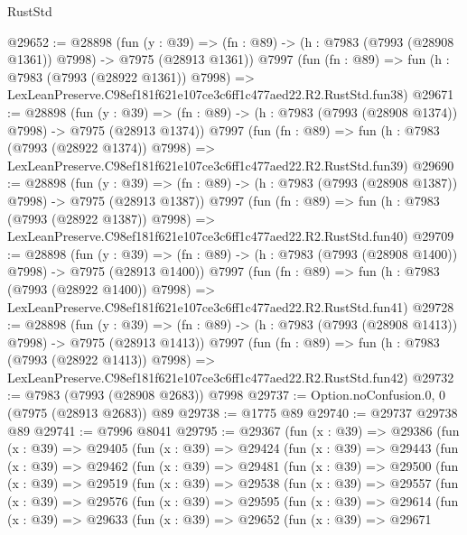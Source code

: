 \begin{lexlean}{RustStd}
\begin{coremodule}
@29652 := @28898
    (fun (y : @39) =>
    (fn : @89) -> (h : @7983 (@7993 (@28908 @1361)) @7998) -> @7975 (@28913 @1361))
    @7997
    (fun (fn : @89) =>
    fun (h : @7983 (@7993 (@28922 @1361)) @7998) =>
    LexLeanPreserve.C98ef181f621e107ce3c6ff1c477aed22.R2.RustStd.fun38)
@29671 := @28898
    (fun (y : @39) =>
    (fn : @89) -> (h : @7983 (@7993 (@28908 @1374)) @7998) -> @7975 (@28913 @1374))
    @7997
    (fun (fn : @89) =>
    fun (h : @7983 (@7993 (@28922 @1374)) @7998) =>
    LexLeanPreserve.C98ef181f621e107ce3c6ff1c477aed22.R2.RustStd.fun39)
@29690 := @28898
    (fun (y : @39) =>
    (fn : @89) -> (h : @7983 (@7993 (@28908 @1387)) @7998) -> @7975 (@28913 @1387))
    @7997
    (fun (fn : @89) =>
    fun (h : @7983 (@7993 (@28922 @1387)) @7998) =>
    LexLeanPreserve.C98ef181f621e107ce3c6ff1c477aed22.R2.RustStd.fun40)
@29709 := @28898
    (fun (y : @39) =>
    (fn : @89) -> (h : @7983 (@7993 (@28908 @1400)) @7998) -> @7975 (@28913 @1400))
    @7997
    (fun (fn : @89) =>
    fun (h : @7983 (@7993 (@28922 @1400)) @7998) =>
    LexLeanPreserve.C98ef181f621e107ce3c6ff1c477aed22.R2.RustStd.fun41)
@29728 := @28898
    (fun (y : @39) =>
    (fn : @89) -> (h : @7983 (@7993 (@28908 @1413)) @7998) -> @7975 (@28913 @1413))
    @7997
    (fun (fn : @89) =>
    fun (h : @7983 (@7993 (@28922 @1413)) @7998) =>
    LexLeanPreserve.C98ef181f621e107ce3c6ff1c477aed22.R2.RustStd.fun42)
@29732 := @7983 (@7993 (@28908 @2683)) @7998
@29737 := Option.noConfusion.{0, 0} (@7975 (@28913 @2683)) @89
@29738 := @1775 @89
@29740 := @29737 @29738 @89
@29741 := @7996 @8041
@29795 := @29367
    (fun (x : @39) =>
    @29386
      (fun (x : @39) =>
      @29405
        (fun (x : @39) =>
        @29424
          (fun (x : @39) =>
          @29443
            (fun (x : @39) =>
            @29462
              (fun (x : @39) =>
              @29481
                (fun (x : @39) =>
                @29500
                  (fun (x : @39) =>
                  @29519
                    (fun (x : @39) =>
                    @29538
                      (fun (x : @39) =>
                      @29557
                        (fun (x : @39) =>
                        @29576
                          (fun (x : @39) =>
                          @29595
                            (fun (x : @39) =>
                            @29614
                              (fun (x : @39) =>
                              @29633
                                (fun (x : @39) =>
                                @29652
                                  (fun (x : @39) =>
                                  @29671

\end{coremodule}
\end{lexlean}
